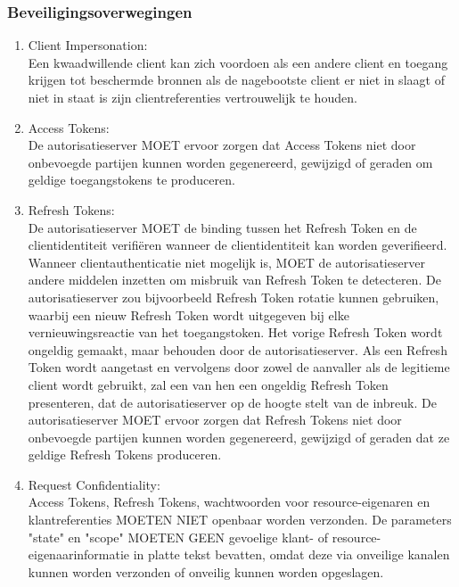 \subsubsection{Beveiligingsoverwegingen}
\label{subsubsec:beveiligingsoverwegingen}
\begin{enumerate}[label=\textbf{-}]
    \item Client Impersonation: \\
    Een kwaadwillende client kan zich voordoen als een andere client en toegang krijgen tot beschermde bronnen als de nagebootste client er niet in slaagt of niet in staat is zijn clientreferenties vertrouwelijk te houden.

    \item Access Tokens: \\
    De autorisatieserver MOET ervoor zorgen dat Access Tokens niet door onbevoegde partijen kunnen worden gegenereerd, gewijzigd of geraden om geldige toegangstokens te produceren.

    \item Refresh Tokens: \\
    De autorisatieserver MOET de binding tussen het Refresh Token en de clientidentiteit verifiëren wanneer de clientidentiteit kan worden geverifieerd. Wanneer clientauthenticatie niet mogelijk is, MOET de autorisatieserver andere middelen inzetten om misbruik van Refresh Token te detecteren. De autorisatieserver zou bijvoorbeeld Refresh Token rotatie kunnen gebruiken, waarbij een nieuw Refresh Token wordt uitgegeven bij elke vernieuwingsreactie van het toegangstoken. Het vorige Refresh Token wordt ongeldig gemaakt, maar behouden door de autorisatieserver. Als een Refresh Token wordt aangetast en vervolgens door zowel de aanvaller als de legitieme client wordt gebruikt, zal een van hen een ongeldig Refresh Token presenteren, dat de autorisatieserver op de hoogte stelt van de inbreuk. De autorisatieserver MOET ervoor zorgen dat Refresh Tokens niet door onbevoegde partijen kunnen worden gegenereerd, gewijzigd of geraden dat ze geldige Refresh Tokens produceren.

    \item Request Confidentiality: \\
    Access Tokens, Refresh Tokens, wachtwoorden voor resource-eigenaren en klantreferenties MOETEN NIET openbaar worden verzonden. De parameters "state" en "scope" MOETEN GEEN gevoelige klant- of resource-eigenaarinformatie in platte tekst bevatten, omdat deze via onveilige kanalen kunnen worden verzonden of onveilig kunnen worden opgeslagen.
\end{enumerate}

